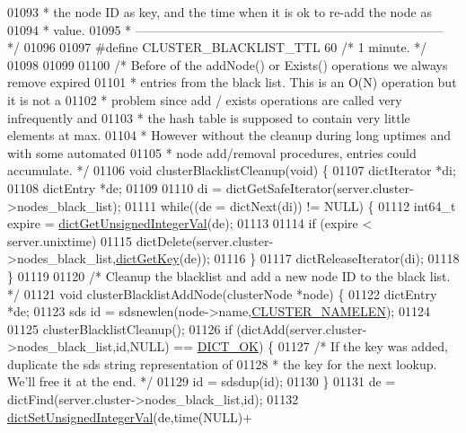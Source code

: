 \begin{DoxyCode}
{{{{{{{{{{{{{{{01093 \textcolor{comment}{ * the node ID as key, and the time when it is ok to re-add the node as}
01094 \textcolor{comment}{ * value.}
01095 \textcolor{comment}{ * -------------------------------------------------------------------------- */}
01096 
01097 \textcolor{preprocessor}{#}\textcolor{preprocessor}{define} \textcolor{preprocessor}{CLUSTER\_BLACKLIST\_TTL} 60      \textcolor{comment}{/* 1 minute. */}
01098 
01099 
01100 \textcolor{comment}{/* Before of the addNode() or Exists() operations we always remove expired}
01101 \textcolor{comment}{ * entries from the black list. This is an O(N) operation but it is not a}
01102 \textcolor{comment}{ * problem since add / exists operations are called very infrequently and}
01103 \textcolor{comment}{ * the hash table is supposed to contain very little elements at max.}
01104 \textcolor{comment}{ * However without the cleanup during long uptimes and with some automated}
01105 \textcolor{comment}{ * node add/removal procedures, entries could accumulate. */}
01106 \textcolor{keywordtype}{void} clusterBlacklistCleanup(\textcolor{keywordtype}{void}) \{
01107     dictIterator *di;
01108     dictEntry *de;
01109 
01110     di = dictGetSafeIterator(server.cluster->nodes\_black\_list);
01111     \textcolor{keywordflow}{while}((de = dictNext(di)) != NULL) \{
01112         int64\_t expire = \hyperlink{dict_8h_ad65abe818fa141e537800699668a7f09}{dictGetUnsignedIntegerVal}(de);
01113 
01114         \textcolor{keywordflow}{if} (expire < server.unixtime)
01115             dictDelete(server.cluster->nodes\_black\_list,\hyperlink{dict_8h_a3271c334309904a3086deca94f96e46e}{dictGetKey}(de));
01116     \}
01117     dictReleaseIterator(di);
01118 \}
01119 
01120 \textcolor{comment}{/* Cleanup the blacklist and add a new node ID to the black list. */}
01121 \textcolor{keywordtype}{void} clusterBlacklistAddNode(clusterNode *node) \{
01122     dictEntry *de;
01123     sds id = sdsnewlen(node->name,\hyperlink{cluster_8h_ace7a882972eff7149675252938643b6e}{CLUSTER\_NAMELEN});
01124 
01125     clusterBlacklistCleanup();
01126     \textcolor{keywordflow}{if} (dictAdd(server.cluster->nodes\_black\_list,id,NULL) == \hyperlink{dict_8h_a2afecbeab8f7efbc183048f52f6d17e5}{DICT\_OK}) \{
01127         \textcolor{comment}{/* If the key was added, duplicate the sds string representation of}
01128 \textcolor{comment}{         * the key for the next lookup. We'll free it at the end. */}
01129         id = sdsdup(id);
01130     \}
01131     de = dictFind(server.cluster->nodes\_black\_list,id);
01132     \hyperlink{dict_8h_aa846a3c28ad69004259435fd44246e10}{dictSetUnsignedIntegerVal}(de,time(NULL)+
}}}}}}}}}}}}}}}
\end{DoxyCode}
